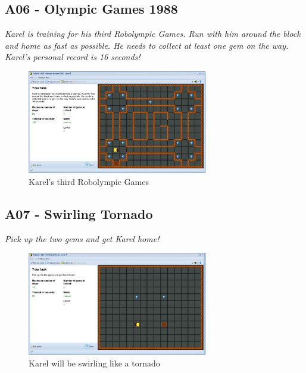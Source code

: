 \documentclass[article,A4,12pt]{llncs}
\begin{document}
\subsection{A06 - Olympic Games 1988 }

{\em Karel is training for his third Robolympic Games. Run with him around the block and home as fast as possible. He needs to collect at least one gem on the way. Karel's personal record is 16 seconds!}

\begin{figure}[!ht]
\begin{center}
\includegraphics[width=0.7\textwidth]{img/a06.png}
\end{center}
\vspace{-4mm}
\caption{Karel's third Robolympic Games}
\label{fig:a06}
\end{figure}
\noindent


\subsection{A07 - Swirling Tornado}

{\em Pick up the two gems and get Karel home!}

\begin{figure}[!ht]
\begin{center}
\includegraphics[width=0.7\textwidth]{img/a07.png}
\end{center}
\vspace{-4mm}
\caption{Karel will be swirling like a tornado}
\label{fig:a07}
\vspace{-1cm}
\end{figure}
\noindent
\newpage
\end{document}
